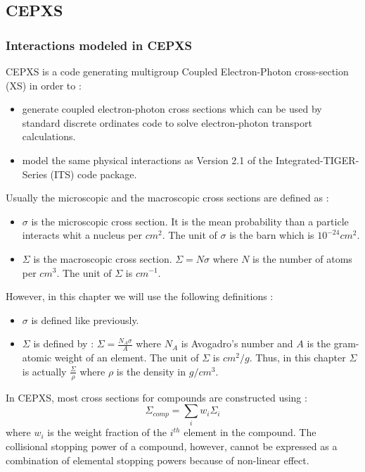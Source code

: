 \subsection{CEPXS}
\subsubsection{Interactions modeled in CEPXS}
CEPXS is a code generating multigroup Coupled Electron-Photon cross-section
(XS) in order to \cite{cepxs} :
\begin{itemize}
\item generate coupled electron-photon cross sections which can be used by
standard discrete ordinates code to solve electron-photon transport
calculations.
\item model the same physical interactions as Version 2.1 of the
Integrated-TIGER-Series (ITS) code package.
\end{itemize}
Usually the microscopic and the macroscopic cross sections are defined as 
\cite{barjon} :
\begin{itemize}
\item $\sigma$ is the microscopic cross section. It is the mean probability than a
particle interacts whit a nucleus per $cm^2$. The unit of $\sigma$ is the barn
which is $10^{-24}cm^2$.
\item $\Sigma$ is the macroscopic cross section. $\Sigma = N \sigma$ where $N$
is the number of atoms per $cm^3$. The unit of $\Sigma$ is $cm^{-1}$.
\end{itemize}
However, in this chapter we will use the following definitions \cite{cepxs} :
\begin{itemize}
\item $\sigma$ is defined like previously.
\item $\Sigma$ is defined by : $\Sigma = \frac{N_A \sigma}{A}$ where $N_A$ is
Avogadro's number and $A$ is the gram-atomic weight of an element. The unit of
$\Sigma$ is $cm^{2}/g$. Thus, in this chapter $\Sigma$ is actually
$\frac{\Sigma}{\rho}$ where $\rho$ is the density in $g/cm^3$.
\end{itemize}
In CEPXS, most cross sections for compounds are constructed using \cite{cepxs} :
\begin{equation}
\Sigma_{comp} = \sum_i w_i \Sigma_i
\end{equation}
where $w_i$ is the weight fraction of the $i^{th}$ element in the compound.
The collisional stopping power of a compound, however, cannot be expressed as a
combination of elemental stopping powers because of non-linear effect.\\
